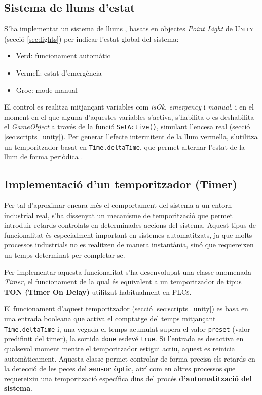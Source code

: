 \documentclass[a4paper,11pt,DIV=13,headings=normal,abstract=true,twoside=semi]{article}
\newcommand{\acro}[1]{\textsc{#1}}
\begin{document}
\subsection{Sistema de llums d'estat}

S'ha implementat un sistema de llums \cite{UnityLighting}, basats en objectes \emph{Point Light} de \acro{Unity} (secció \ref{sec:lights}) per indicar l'estat global del sistema:

\begin{itemize}
\item Verd: funcionament automàtic
\item Vermell: estat d'emergència
\item Groc: mode manual
\end{itemize}

El control es realitza mitjançant variables com \emph{isOk}, \emph{emergency} i \emph{manual}, i en el moment en el que alguna d'aquestes variables s'activa, s'habilita o es deshabilita el \emph{GameObject} a través de la funció \texttt{SetActive()}, simulant l'encesa real (secció \ref{sec:scripts_unity}). Per generar l'efecte intermitent de la llum vermella, s'utilitza un temporitzador basat en \texttt{Time.deltaTime}, que permet alternar l'estat de la llum de forma periòdica \cite{UnityTime}.

\subsection{Implementació d'un temporitzador (Timer)}
\label{sec:timers}


Per tal d'aproximar encara més el comportament del sistema a un entorn industrial real, s'ha dissenyat un mecanisme de temporització que permet introduir retards controlats en determinades accions del sistema. Aquest tipus de funcionalitat és especialment important en sistemes automatitzats, ja que molts processos industrials no es realitzen de manera instantània, sinó que requereixen un temps determinat per completar-se. 

Per implementar aquesta funcionalitat s'ha desenvolupat una classe anomenada \emph{Timer}, el funcionament de la qual és equivalent a un temporitzador de tipus \textbf{TON (Timer On Delay)} utilitzat habitualment en \acro{PLCs}.

El funcionament d'aquest temporitzador (secció \ref{sec:scripts_unity}) es basa en una entrada booleana que activa el comptatge del temps mitjançant \texttt{Time.deltaTime} \cite{UnityTime} i, una vegada el temps acumulat supera el valor \texttt{preset} (valor predifinit del timer), la sortida \texttt{done} esdevé \texttt{true}. Si l'entrada es desactiva en qualsevol moment mentre el temporitzador estigui actiu, aquest es reinicia automàticament. Aquesta classe permet controlar de forma precisa els retards en la detecció de les peces del \textbf{sensor òptic}, així com en altres processos que requereixin una temporització específica dins del procés \textbf{d'automatització del sistema}.
\end{document}
